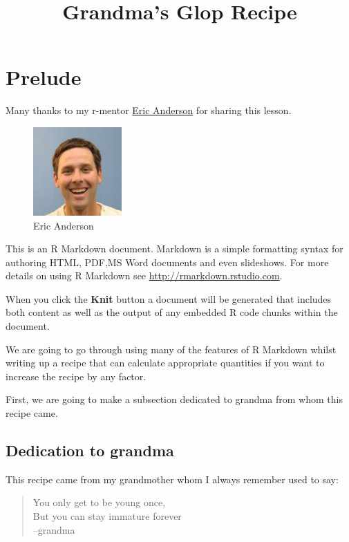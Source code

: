 \documentclass[
]{article}
\title{Grandma's Glop Recipe}
\author{}
\date{\vspace{-2.5em}}
\begin{document}
\maketitle

{
\setcounter{tocdepth}{2}
\tableofcontents
}
\hypertarget{prelude}{%
\section{Prelude}\label{prelude}}

Many thanks to my r-mentor
\href{https://swfsc.noaa.gov/staff.aspx?id=740}{Eric Anderson} for
sharing this lesson.

\begin{figure}
\centering
\includegraphics{../images/Eric-Anderson-60.jpg}
\caption{Eric Anderson}
\end{figure}

This is an R Markdown document. Markdown is a simple formatting syntax
for authoring HTML, PDF,MS Word documents and even slideshows. For more
details on using R Markdown see \url{http://rmarkdown.rstudio.com}.

When you click the \textbf{Knit} button a document will be generated
that includes both content as well as the output of any embedded R code
chunks within the document.

We are going to go through using many of the features of R Markdown
whilst writing up a recipe that can calculate appropriate quantities if
you want to increase the recipe by any factor.

First, we are going to make a subsection dedicated to grandma from whom
this recipe came.

\hypertarget{tag-it}{%
\subsection{Dedication to grandma}\label{tag-it}}

This recipe came from my grandmother whom I always remember used to say:

\begin{quote}
You only get to be young once,\\
But you can stay immature forever\\
--grandma
\end{quote}
\end{document}
